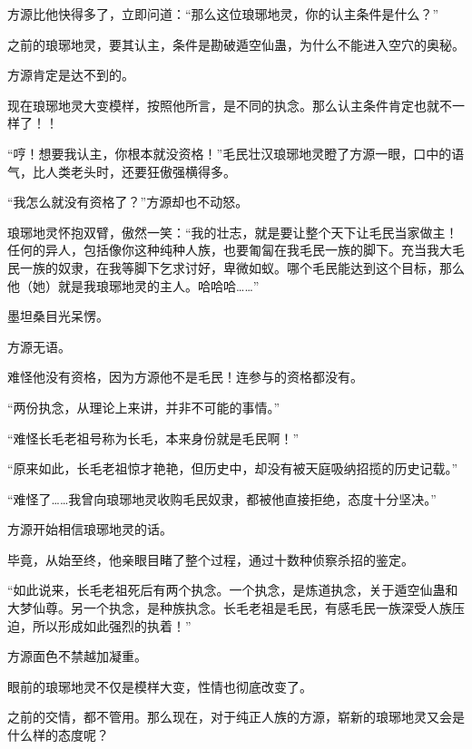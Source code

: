 \begin{this_body}
方源比他快得多了，立即问道：“那么这位琅琊地灵，你的认主条件是什么？”

之前的琅琊地灵，要其认主，条件是勘破遁空仙蛊，为什么不能进入空穴的奥秘。

方源肯定是达不到的。

现在琅琊地灵大变模样，按照他所言，是不同的执念。那么认主条件肯定也就不一样了！！

“哼！想要我认主，你根本就没资格！”毛民壮汉琅琊地灵瞪了方源一眼，口中的语气，比人类老头时，还要狂傲强横得多。

“我怎么就没有资格了？”方源却也不动怒。

琅琊地灵怀抱双臂，傲然一笑：“我的壮志，就是要让整个天下让毛民当家做主！任何的异人，包括像你这种纯种人族，也要匍匐在我毛民一族的脚下。充当我大毛民一族的奴隶，在我等脚下乞求讨好，卑微如蚁。哪个毛民能达到这个目标，那么他（她）就是我琅琊地灵的主人。哈哈哈……”

墨坦桑目光呆愣。

方源无语。

难怪他没有资格，因为方源他不是毛民！连参与的资格都没有。

“两份执念，从理论上来讲，并非不可能的事情。”

“难怪长毛老祖号称为长毛，本来身份就是毛民啊！”

“原来如此，长毛老祖惊才艳艳，但历史中，却没有被天庭吸纳招揽的历史记载。”

“难怪了……我曾向琅琊地灵收购毛民奴隶，都被他直接拒绝，态度十分坚决。”

方源开始相信琅琊地灵的话。

毕竟，从始至终，他亲眼目睹了整个过程，通过十数种侦察杀招的鉴定。

“如此说来，长毛老祖死后有两个执念。一个执念，是炼道执念，关于遁空仙蛊和大梦仙尊。另一个执念，是种族执念。长毛老祖是毛民，有感毛民一族深受人族压迫，所以形成如此强烈的执着！”

方源面色不禁越加凝重。

眼前的琅琊地灵不仅是模样大变，性情也彻底改变了。

之前的交情，都不管用。那么现在，对于纯正人族的方源，崭新的琅琊地灵又会是什么样的态度呢？

\end{this_body}

